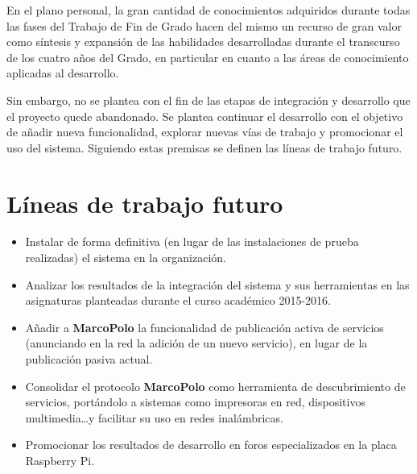 En el plano personal, la gran cantidad de conocimientos adquiridos durante todas las fases del Trabajo de Fin de Grado hacen del mismo un recurso de gran valor como síntesis y expansión de las habilidades desarrolladas durante el transcurso de los cuatro años del Grado, en particular en cuanto a las áreas de conocimiento aplicadas al desarrollo.

Sin embargo, no se plantea con el fin de las etapas de integración y desarrollo que el proyecto quede abandonado. Se plantea continuar el desarrollo con el objetivo de añadir nueva funcionalidad, explorar nuevas vías de trabajo y promocionar el uso del sistema. Siguiendo estas premisas se definen las líneas de trabajo futuro.

\section{Líneas de trabajo futuro}

\begin{itemize}
	\item Instalar de forma definitiva (en lugar de las instalaciones de prueba realizadas) el sistema en la organización.
	\item Analizar los resultados de la integración del sistema y sus herramientas en las asignaturas planteadas durante el curso académico 2015-2016.
	\item Añadir a \textbf{MarcoPolo} la funcionalidad de publicación activa de servicios (anunciando en la red la adición de un nuevo servicio), en lugar de la publicación pasiva actual.
	\item Consolidar el protocolo \textbf{MarcoPolo} como herramienta de descubrimiento de servicios, portándolo a sistemas como impresoras en red, dispositivos multimedia\dots y facilitar su uso en redes inalámbricas.
	\item Promocionar los resultados de desarrollo en foros especializados en la placa Raspberry Pi.
\end{itemize}